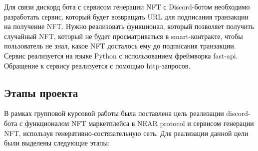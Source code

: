 Для связи дискорд бота с сервисом генерации NFT  с Discord-ботом необходимо разработать сервис, который будет возвращать URL для подписания транзакции на получение NFT. Нужно реализовать функционал, который позволяет получить случайный NFT, который не будет просматриваться в smart-контракте, чтобы пользователь не знал, какое NFT досталось ему до подписания транзакции. Сервис реализуется на языке Python с использованием фреймворка fast-api. Обращение к сервису реализуется с помощью http-запросов.

\subsection{Этапы проекта}
В рамках групповой курсовой работы была поставлена цель реализации discord-бота с функционалом NFT маркетплейса в NEAR protocol и сервисом генерации NFT, используя генеративно-состязательную сеть. Для реализации данной цели были выделены следующие этапы:
